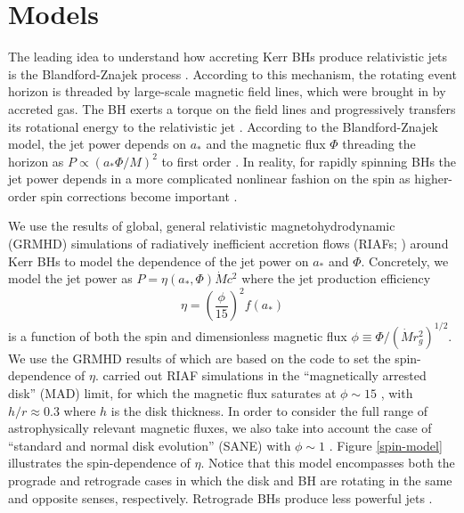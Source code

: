 \documentclass[twocolumn]{aastex62} %
\begin{document}





\section{Models}    \label{models}

The leading idea to understand how accreting Kerr BHs produce relativistic jets is the Blandford-Znajek process \citep{Blandford1977, Blandford2019}. According to this mechanism, the rotating event horizon is threaded by large-scale magnetic field lines, which were brought in by accreted gas. %
The BH exerts a torque on the field lines and progressively transfers its rotational energy to the relativistic jet . According to the Blandford-Znajek model, the jet power depends on $a_*$ and the magnetic flux $\Phi$ threading the horizon as $P \propto ( a_* \Phi/M )^2$ to first order \citep{Blandford1977}. In reality, for rapidly spinning BHs the jet power depends in a more complicated nonlinear fashion on the spin as higher-order spin corrections become important . 

We use the results of global, general relativistic magnetohydrodynamic (GRMHD) simulations of radiatively inefficient accretion flows (RIAFs; \citealt{Yuan2014}) around Kerr BHs to model the dependence of the jet power on $a_*$ and $\Phi$. Concretely, we model the jet power as $P = \eta(a_*, \Phi) \dot{M} c^2$ where the jet production efficiency 
\begin{equation}
\eta = \left( \frac{\phi}{15} \right)^2 f(a_*)
\end{equation}
is a function of both the spin and dimensionless magnetic flux $\phi \equiv \Phi/(\dot{M} r_g^2)^{1/2}$. We use the GRMHD results of \cite{Sasha2012a} which are based on the  code \citep{Gammie2003} to set the spin-dependence of $\eta$. \cite{Sasha2012a} carried out RIAF simulations in the ``magnetically arrested disk'' (MAD) limit, for which the magnetic flux saturates at $\phi \sim 15$ \citep{Narayan2003, Sasha2011}, with $h/r \approx 0.3$ where $h$ is the disk thickness. In order to consider the full range of astrophysically relevant magnetic fluxes, we also take into account the case of  ``standard and normal disk evolution'' (SANE) with $\phi \sim 1$ . Figure  \ref{spin-model} illustrates the spin-dependence of $\eta$. Notice that this model encompasses both the prograde and retrograde cases in which the disk and BH are rotating in the same and opposite senses, respectively. Retrograde BHs produce less powerful jets \citep{Sasha2012}. 
\end{document}
